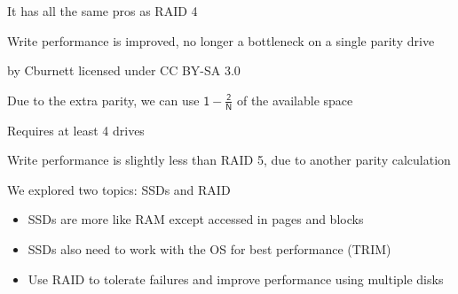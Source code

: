 \begin{slide}
  

  It has all the same pros as RAID 4
  \medskip

  Write performance is improved, no longer a bottleneck on a single parity
  drive

\end{slide}

\begin{slide}
  

  \begin{center}
    
  \end{center}

  \begin{flushright}
    by Cburnett licensed under CC BY-SA 3.0
  \end{flushright}

\end{slide}

\begin{slide}


  Due to the extra parity, we can use $\mathsf{1 - \frac{2}{N}}$ of the
  available space

  \leftspace{}Requires at least 4 drives
  \medskip

  Write performance is slightly less than RAID 5, due to another parity
  calculation

\end{slide}

\begin{slide}
  

  We explored two topics: SSDs and RAID

  \begin{itemize}
    \item SSDs are more like RAM except accessed in pages and blocks
    \item SSDs also need to work with the OS for best performance (TRIM)
    \item Use RAID to tolerate failures and improve performance using multiple disks
  \end{itemize}

\end{slide}


